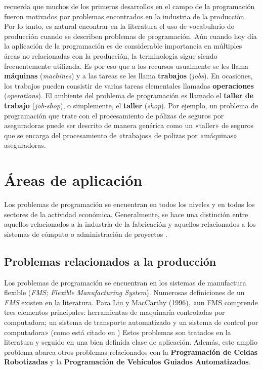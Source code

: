 \documentclass[draft,12pt,headsepline,footsepline,paper=letter]{scrreprt}
\begin{document}
\citet[p.~3]{Baker2009} recuerda que muchos de los primeros desarrollos en el campo de la programación fueron motivados por problemas encontrados en la industria de la producción. Por lo tanto, es natural encontrar en la literatura el uso de vocabulario de producción cuando se describen problemas de programación. Aún cuando hoy día la aplicación de la programación es de considerable importancia en múltiples áreas no relacionadas con la producción, la terminología sigue siendo frecuentemente utilizada. Es por eso que a los recursos usualmente se les llama \textbf{máquinas} (\textit{machines}) y a las tareas se les llama \textbf{trabajos} (\textit{jobs}). En ocasiones, los trabajos pueden consistir de varias tareas elementales llamadas \textbf{operaciones} (\textit{operations}). El ambiente del problema de programación es llamado el \textbf{taller de trabajo} (\textit{job-shop}), o simplemente, el \textbf{taller} (\textit{shop}). Por ejemplo, un problema de programación que trate con el procesamiento de pólizas de seguros por aseguradoras puede ser descrito de manera genérica como un «taller» de seguros que se encarga del procesamiento de «trabajos» de polizas por «máquinas» aseguradoras.

\section{Áreas de aplicación}
\label{areas_aplicacion}

Los problemas de programación se encuentran en todos los niveles y en todos los sectores de la actividad económica. Generalmente, se hace una distinción entre aquellos relacionados a la industria de la fabricación y aquellos relacionados a los sistemas de cómputo o administración de proyectos \citep[p.~6]{TKindt2002}.

\subsection{Problemas relacionados a la producción} %
\label{problemas_relacionados_produccion}

Los problemas de programación se encuentran en los sistemas de manufactura flexible (\textit{FMS; Flexible Manufacturing System}). Numerosas definiciones de un \textit{FMS} existen en la literatura. Para Liu y MacCarthy (1996), «un FMS comprende tres elementos principales: herramientas de maquinaria controladas por computadora; un sistema de transporte automatizado y un sistema de control por computadora» (como está citado en \citealp[p.~6]{TKindt2002})  Estos problemas son tratados en la literatura y seguido en una bien definida clase de aplicación. Además, este amplio problema abarca otros problemas relacionados con la \textbf{Programación de Celdas Robotizadas} y la \textbf{Programación de Vehículos Guiados Automatizados}.
\end{document}
